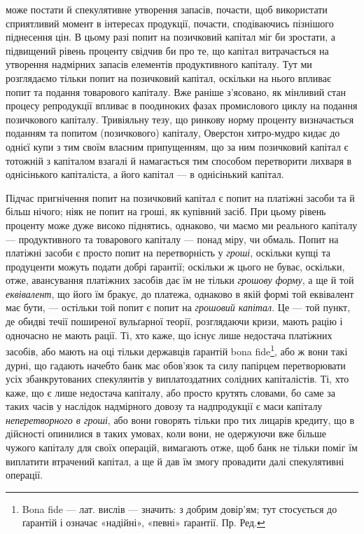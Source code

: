 \parcont{}  %
може постати й спекулятивне утворення запасів, почасти, щоб використати сприятливий
момент в інтересах продукції, почасти, сподіваючись пізнішого піднесення
цін. В цьому разі попит на позичковий капітал міг би зростати, а підвищений
рівень проценту свідчив би про те, що капітал витрачається на утворення
надмірних запасів елементів продуктивного капіталу. Тут ми розглядаємо
тільки попит на позичковий капітал, оскільки на нього впливає попит та
подання товарового капіталу. Вже раніше з’ясовано, як мінливий стан процесу
репродукції впливає в поодиноких фазах промислового циклу на подання позичкового
капіталу. Тривіяльну тезу, що ринкову норму проценту визначається
поданням та попитом (позичкового) капіталу, Оверстон хитро-мудро кидає до
однієї купи з тим своїм власним припущенням, що за ним позичковий капітал
є тотожній з капіталом взагалі й намагається тим способом перетворити лихваря
в однісінького капіталіста, а його капітал — в однісінький капітал.

Підчас пригнічення попит на позичковий капітал є попит на платіжні засоби
та й більш нічого; ніяк не попит на гроші, як купівний засіб. При цьому
рівень проценту може дуже високо піднятись, однаково, чи маємо ми реального
капіталу — продуктивного та товарового капіталу — понад міру, чи обмаль.
Попит на платіжні засоби є просто попит на перетворність у \emph{гроші}, оскільки
купці та продуценти можуть подати добрі ґарантії; оскільки ж цього не буває,
оскільки, отже, авансування платіжних засобів дає їм не тільки \emph{грошову}
\emph{форму}, а ще й той \emph{еквівалент}, що його їм бракує, до платежа, однаково в якій
формі той еквівалент має бути, — остільки той попит є попит на \emph{грошовий капітал}.
Це — той пункт, де обидві течії поширеної вульґарної теорії, розглядаючи
кризи, мають рацію і одночасно не мають рації. Ті, хто каже, що існує лише недостача
платіжних засобів, або мають на оці тільки державців ґарантій bona
fide\footnote{
Bona fide — лат. вислів — значить: з добрим довір’ям; тут стосується до ґарантій і означає
«надійні», «певні» ґарантії. Пр. Ред.
}, або ж вони такі дурні, що гадають начебто банк має обов’язок та силу
папірцем перетворювати усіх збанкрутованих спекулянтів у виплатоздатних солідних
капіталістів. Ті, хто каже, що є лише недостача капіталу, або просто
крутять словами, бо саме за таких часів у наслідок надмірного довозу та надпродукції
є маси капіталу \emph{неперетворного в гроші}, або вони говорять тільки
про тих лицарів кредиту, що в дійсності опинилися в таких умовах, коли вони,
не одержуючи вже більше чужого капіталу для своїх операцій, вимагають
отже, щоб банк не тільки поміг їм виплатити втрачений капітал, а ще й дав
їм змогу провадити далі спекулятивні операції.

